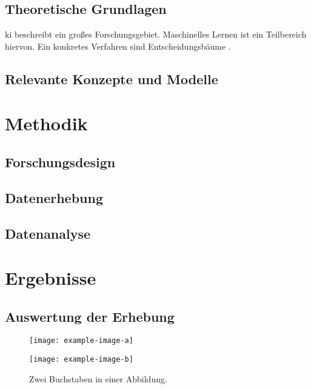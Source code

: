 \documentclass[twoside=false,DIV=8]{scrbook}
\begin{document}
\section{Theoretische Grundlagen}

\Gls{ki} beschreibt ein großes Forschungsgebiet. Maschinelles Lernen ist ein Teilbereich hiervon. Ein konkretes Verfahren sind Entscheidungsbäume \autocite{knuth_2021}.

\lipsum[1-2]

\section{Relevante Konzepte und Modelle}

\lipsum[3-5]

\chapter{Methodik}

\section{Forschungsdesign}

\lipsum[1-2]

\section{Datenerhebung}

\lipsum[3-4]

\section{Datenanalyse}

\lipsum[5-6]

\chapter{Ergebnisse}

\section{Auswertung der Erhebung}

\lipsum[1-3]

\begin{figure}[t]
  \begin{minipage}{\linewidth}
    \begin{minipage}{0.5\linewidth}
      \centering
      \texttt{[image: example-image-a]}
    \end{minipage}%
    \begin{minipage}{0.5\linewidth}
      \centering
      \texttt{[image: example-image-b]}
    \end{minipage}
    \caption{Zwei Buchstaben in einer Abbildung.}
  \end{minipage}
\end{figure}
\end{document}
